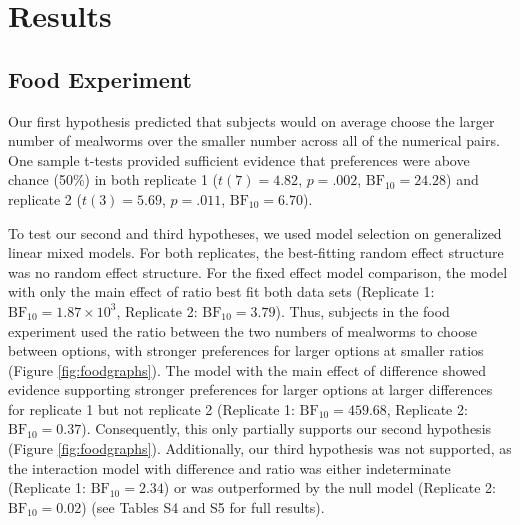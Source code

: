 \documentclass[
  ,doc,floatsintext]{apa6}
\begin{document}
\hypertarget{results}{%
\section{Results}\label{results}}

\hypertarget{food-experiment-1}{%
\subsection{Food Experiment}\label{food-experiment-1}}

Our first hypothesis predicted that subjects would on average choose the larger number of mealworms over the smaller number across all of the numerical pairs. One sample t-tests provided sufficient evidence that preferences were above chance (50\%) in both replicate 1 (\(t(7) = 4.82\), \(p = .002\), \(\mathrm{BF}_{\textrm{10}} = 24.28\)) and replicate 2 (\(t(3) = 5.69\), \(p = .011\), \(\mathrm{BF}_{\textrm{10}} = 6.70\)).

To test our second and third hypotheses, we used model selection on generalized linear mixed models. For both replicates, the best-fitting random effect structure was no random effect structure. For the fixed effect model comparison, the model with only the main effect of ratio best fit both data sets (Replicate 1: \(\mathrm{BF}_{\textrm{10}} = 1.87 \times 10^{3}\), Replicate 2: \(\mathrm{BF}_{\textrm{10}} = 3.79\)). Thus, subjects in the food experiment used the ratio between the two numbers of mealworms to choose between options, with stronger preferences for larger options at smaller ratios (Figure \ref{fig:foodgraphs}). The model with the main effect of difference showed evidence supporting stronger preferences for larger options at larger differences for replicate 1 but not replicate 2 (Replicate 1: \(\mathrm{BF}_{\textrm{10}} = 459.68\), Replicate 2: \(\mathrm{BF}_{\textrm{10}} = 0.37\)). Consequently, this only partially supports our second hypothesis (Figure \ref{fig:foodgraphs}). Additionally, our third hypothesis was not supported, as the interaction model with difference and ratio was either indeterminate (Replicate 1: \(\mathrm{BF}_{\textrm{10}} = 2.34\)) or was outperformed by the null model (Replicate 2: \(\mathrm{BF}_{\textrm{10}} = 0.02\)) (see Tables S4 and S5 for full results).
\end{document}
